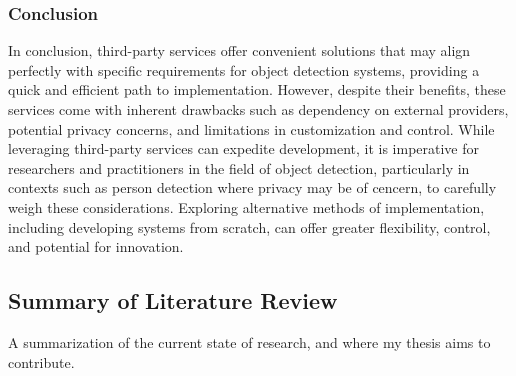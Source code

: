 \subsubsection{Conclusion}

In conclusion, third-party services offer convenient solutions that may align perfectly with specific requirements for object detection systems, providing a quick and efficient path to implementation. However, despite their benefits, these services come with inherent drawbacks such as dependency on external providers, potential privacy concerns, and limitations in customization and control. While leveraging third-party services can expedite development, it is imperative for researchers and practitioners in the field of object detection, particularly in contexts such as person detection where privacy may be of cencern, to carefully weigh these considerations. Exploring alternative methods of implementation, including developing systems from scratch, can offer greater flexibility, control, and potential for innovation.

\subsection{Summary of Literature Review}
A summarization of the current state of research, and where my thesis aims to contribute.
